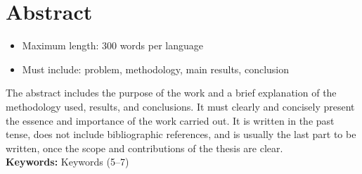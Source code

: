 \chapter{Abstract}

\begin{itemize}
    \item Maximum length: 300 words per language
    \item Must include: problem, methodology, main results, conclusion
    
\end{itemize}

The abstract includes the purpose of the work and a brief explanation of the methodology used, results, and conclusions. It must clearly and concisely present the essence and importance of the work carried out. It is written in the past tense, does not include bibliographic references, and is usually the last part to be written, once the scope and contributions of the thesis are clear.\\

\textbf{Keywords:} Keywords (5–7)
\newpage